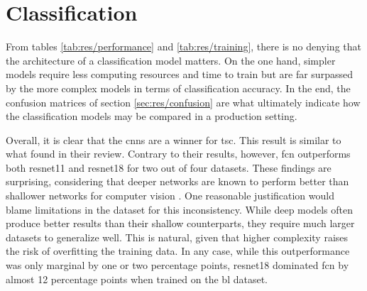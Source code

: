 \section{Classification}

From tables \ref{tab:res/performance} and \ref{tab:res/training}, there is no denying that the architecture of a classification model matters. On the one hand, simpler models require less computing resources and time to train but are far surpassed by the more complex models in terms of classification accuracy. In the end, the confusion matrices of section \ref{sec:res/confusion} are what ultimately indicate how the classification models may be compared in a production setting. 



Overall, it is clear that the \acrshort{cnn}s are a winner for \acrlong{tsc}. This result is similar to what \textcite{fawaz2018} found in their review. Contrary to their results, however, \acrshort{fcn} outperforms both \acrshort{resnet11} and \acrshort{resnet18} for two out of four datasets. These findings are surprising, considering that deeper networks are known to perform better than shallower networks for computer vision \cite{he2015}. One reasonable justification would blame limitations in the dataset for this inconsistency. While deep models often produce better results than their shallow counterparts, they require much larger datasets to generalize well. This is natural, given that higher complexity raises the risk of overfitting the training data.
In any case, while this outperformance was only marginal by one or two percentage points, \acrshort{resnet18} dominated \acrshort{fcn} by almost 12 percentage points when trained on the \acrshort{bl} dataset. 


